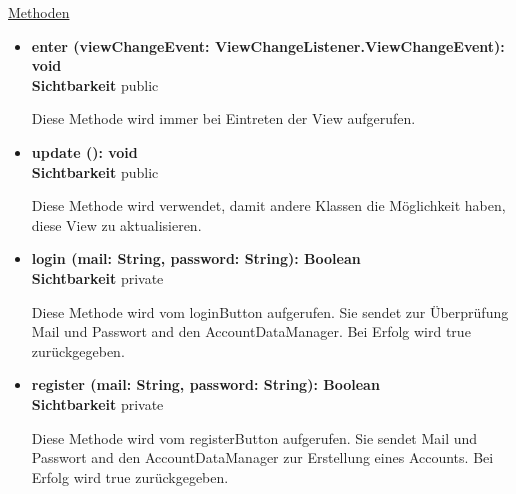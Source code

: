 \underline{Methoden}
\begin{itemize}
\itemsep0pt
\item \textbf{enter (viewChangeEvent: ViewChangeListener.ViewChangeEvent): void}\hfill\\
\textbf{Sichtbarkeit} public

Diese Methode wird immer bei Eintreten der View aufgerufen.

\item \textbf{update (): void}\hfill\\
\textbf{Sichtbarkeit} public

Diese Methode wird verwendet, damit andere Klassen die Möglichkeit haben, diese View zu aktualisieren.

\item \textbf{login (mail: String, password: String): Boolean} \hfill\\ 
\textbf{Sichtbarkeit} private

Diese Methode wird vom loginButton aufgerufen. Sie sendet zur Überprüfung Mail und Passwort and den AccountDataManager. Bei Erfolg wird true zurückgegeben.

\item \textbf{register (mail: String, password: String): Boolean}\hfill\\
\textbf{Sichtbarkeit} private

Diese Methode wird vom registerButton aufgerufen. Sie sendet Mail und Passwort and den AccountDataManager zur Erstellung eines Accounts. Bei Erfolg wird true zurückgegeben.

\end{itemize}

